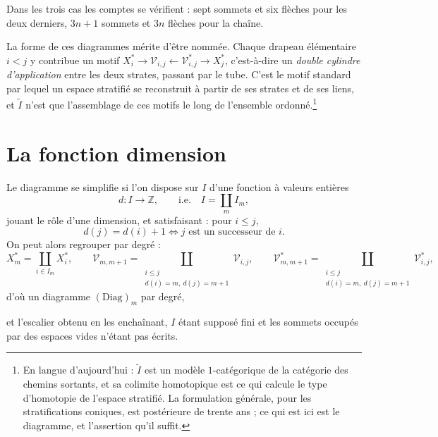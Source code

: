 \documentclass[11pt,a4paper]{article}
\begin{document}
Dans les trois cas les comptes se vérifient : sept sommets et six flèches pour
les deux derniers, $3n+1$ sommets et $3n$ flèches pour la chaîne.

La forme de ces diagrammes mérite d'être nommée. Chaque drapeau élémentaire
$i < j$ y contribue un motif $X_{i}^{*} \to \mathcal{V}_{i,j} \leftarrow
\mathcal{V}^{*}_{i,j} \to X_{j}^{*}$, c'est-à-dire un \emph{double cylindre
d'application} entre les deux strates, passant par le tube. C'est le motif
standard par lequel un espace stratifié se reconstruit à partir de ses strates et
de ses liens, et $\widetilde{I}$ n'est que l'assemblage de ces motifs le long de
l'ensemble ordonné.\footnote{En langue d'aujourd'hui : $\widetilde{I}$ est un
modèle $1$-catégorique de la catégorie des chemins sortants, et sa colimite
homotopique est ce qui calcule le type d'homotopie de l'espace stratifié. La
formulation générale, pour les stratifications coniques, est postérieure de trente
ans ; ce qui est ici est le diagramme, et l'assertion qu'il suffit.}

\section*{La fonction dimension}

Le diagramme se simplifie si l'on dispose sur $I$ d'une fonction à valeurs
entières
\[
  d \colon I \longrightarrow \mathbb{Z},
  \qquad \text{i.e.} \quad I = \coprod_{m} I_{m},
\]
jouant le rôle d'une dimension, et satisfaisant : pour $i \leq j$,
\[
  d(j) = d(i) + 1 \iff j \text{ est un successeur de } i.
\]
On peut alors regrouper par degré :
\[
  X_{m}^{*} = \coprod_{i \in I_{m}} X_{i}^{*},
  \qquad
  \mathcal{V}_{m,m+1} = \coprod_{\substack{i \leq j \\ d(i)=m,\ d(j)=m+1}}
    \mathcal{V}_{i,j},
  \qquad
  \mathcal{V}^{*}_{m,m+1} = \coprod_{\substack{i \leq j \\ d(i)=m,\ d(j)=m+1}}
    \mathcal{V}^{*}_{i,j},
\]
d'où un diagramme $(\mathrm{Diag})_{m}$ par degré,


et l'escalier obtenu en les enchaînant, $I$ étant supposé fini et les sommets
occupés par des espaces vides n'étant pas écrits.
\end{document}
